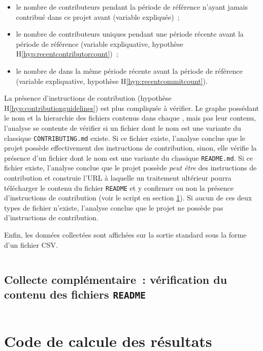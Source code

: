 \begin{itemize}
    \item le nombre de contributeurs pendant la période de référence n'ayant jamais contribué dans ce projet
        avant (variable expliquée) ;
    \item le nombre de contributeurs uniques pendant une période récente avant la période de référence
        (variable expliquative, hypothèse H\ref{hyp:recentcontributorcount}) ;
    \item le nombre de  dans la même période récente avant la période de référence (variable
        expliquative, hypothèse H\ref{hyp:recentcommitcount}).
\end{itemize}

La présence d'instructions de contribution (hypothèse H\ref{hyp:contributionguidelines}) est plus compliquée à
vérifier. Le graphe possédant le nom et la hierarchie des fichiers contenus dans chaque , mais
pas leur contenu, l'analyse se contente de vérifier si un fichier dont le nom est une variante du classique
\texttt{CONTRIBUTING.md} existe. Si ce fichier existe, l'analyse conclue que le projet possède effectivement
des instructions de contribution, sinon, elle vérifie la présence d'un fichier dont le nom est une variante du
classique \texttt{README.md}. Si ce fichier existe, l'analyse conclue que le projet possède \emph{peut être}
des instructions de contribution et construie l'URL à laquelle un traitement ultérieur pourra télécharger le
contenu du fichier \texttt{README} et y confirmer ou non la présence d'instructions de contribution (voir le
script en section \ref{sec:checkreadme.py}). Si aucun de ces deux types de fichier n'existe, l'analyse conclue
que le projet ne possède pas d'instructions de contribution.

Enfin, les données collectées sont affichées sur la sortie standard sous la forme d'un fichier CSV.

\inputminted[fontsize=\footnotesize,linenos,breaklines]{java}{experiment/data_collection/CollectData.java}

\section{Collecte complémentaire : vérification du contenu des fichiers \texttt{README}}
\label{sec:checkreadme.py}

\inputminted[fontsize=\footnotesize,linenos,breaklines]{python}{experiment/data_collection/check_readme_contents.py}

\chapter{Code de calcule des résultats}
